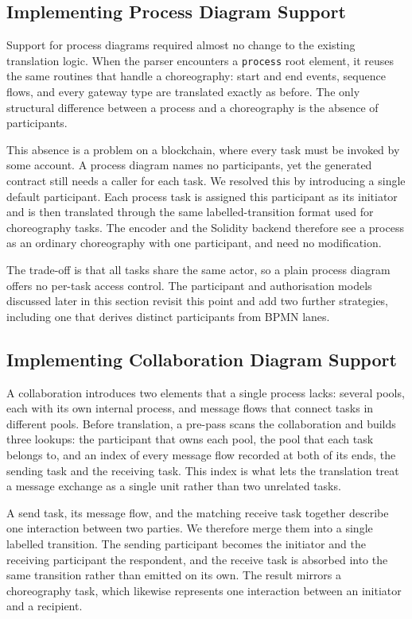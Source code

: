 \documentclass[runningheads]{llncs}
\begin{document}
\subsection{Implementing Process Diagram Support}
Support for process diagrams required almost no change to the existing translation logic. When the parser encounters a \texttt{process} root element, it reuses the same routines that handle a choreography: start and end events, sequence flows, and every gateway type are translated exactly as before. The only structural difference between a process and a choreography is the absence of participants.

This absence is a problem on a blockchain, where every task must be invoked by some account. A process diagram names no participants, yet the generated contract still needs a caller for each task. We resolved this by introducing a single default participant. Each process task is assigned this participant as its initiator and is then translated through the same labelled-transition format used for choreography tasks. The encoder and the Solidity backend therefore see a process as an ordinary choreography with one participant, and need no modification.

The trade-off is that all tasks share the same actor, so a plain process diagram offers no per-task access control. The participant and authorisation models discussed later in this section revisit this point and add two further strategies, including one that derives distinct participants from BPMN lanes.

\subsection{Implementing Collaboration Diagram Support}
A collaboration introduces two elements that a single process lacks: several pools, each with its own internal process, and message flows that connect tasks in different pools. Before translation, a pre-pass scans the collaboration and builds three lookups: the participant that owns each pool, the pool that each task belongs to, and an index of every message flow recorded at both of its ends, the sending task and the receiving task. This index is what lets the translation treat a message exchange as a single unit rather than two unrelated tasks.

A send task, its message flow, and the matching receive task together describe one interaction between two parties. We therefore merge them into a single labelled transition. The sending participant becomes the initiator and the receiving participant the respondent, and the receive task is absorbed into the same transition rather than emitted on its own. The result mirrors a choreography task, which likewise represents one interaction between an initiator and a recipient.
\end{document}
